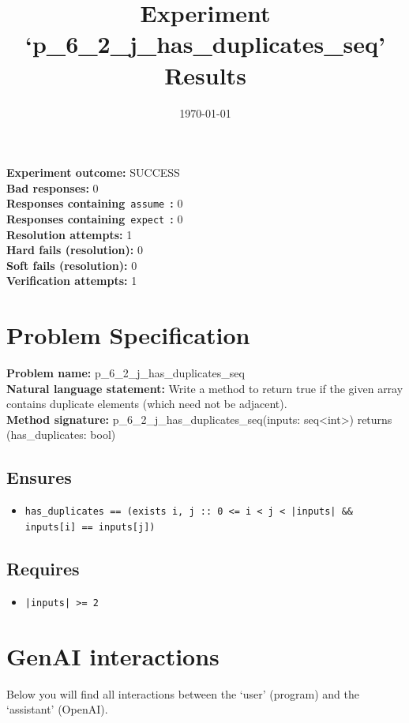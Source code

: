 \documentclass{article}
\begin{document}
\title{Experiment `p\_6\_2\_j\_has\_duplicates\_seq' Results}
\author{\today}
\date{}
\maketitle
\textbf{Experiment outcome: }SUCCESS
\\\textbf{Bad responses: }0
\\\textbf{Responses containing}~\texttt{assume}~\textbf{: }0
\\\textbf{Responses containing}~\texttt{expect}~\textbf{: }0
\\\textbf{Resolution attempts: }1
\\\textbf{Hard fails (resolution): }0
\\\textbf{Soft fails (resolution): }0
\\\textbf{Verification attempts: }1
\section*{Problem Specification}
\textbf{Problem name: }p\_6\_2\_j\_has\_duplicates\_seq
\\\textbf{Natural language statement: }Write a method to return true if the given array contains duplicate elements (which need not be adjacent).
\\\textbf{Method signature: }p\_6\_2\_j\_has\_duplicates\_seq(inputs: seq<int>) returns (has\_duplicates: bool)
\subsection*{Ensures}
\begin{itemize}
\item \texttt{has\_duplicates == (exists i, j :: 0 <= i < j < |inputs| \&\& inputs[i] == inputs[j])}
\end{itemize}
\subsection*{Requires}
\begin{itemize}
\item \texttt{|inputs| >= 2}
\end{itemize}
\clearpage
\section*{GenAI interactions}
Below you will find all interactions between the `user' (program) and the `assistant' (OpenAI).
\end{document}
